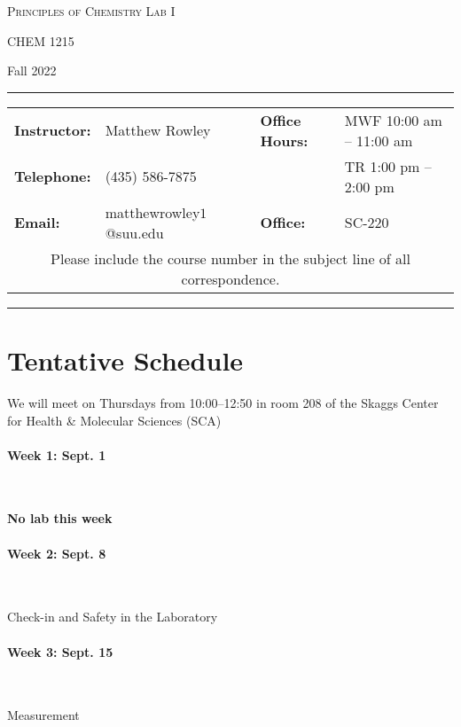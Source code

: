 \documentclass[12pt, letterpaper]{article}
\begin{document}
\begin{center}
	{\Large \textsc{Principles of Chemistry Lab I}}

	CHEM 1215
\end{center}
\begin{center}
	{\large Fall 2022}
\end{center}
\begin{center}
	\rule{0.99\textwidth}{0.4pt}
	\begin{tabular}{llcll}
		\textbf{Instructor:} & Matthew Rowley           &  & \textbf{Office Hours:} & MWF 10:00 am -- 11:00 am \\
		\textbf{Telephone:}  & (435) 586-7875           &  &                        & TR 1:00 pm -- 2:00 pm    \\
		\textbf{Email:}      & matthewrowley$1$@suu.edu &  & \textbf{Office:}       & SC-220                   \\
		\multicolumn{5}{c}{Please include the course number in the subject line of all correspondence.}
	\end{tabular}
	\rule{0.99\textwidth}{0.4pt}
\end{center}

\section*{Tentative Schedule}
\begin{description}
	\item We will meet on Thursdays from 10:00--12:50 in room 208 of the Skaggs Center for Health \& Molecular Sciences (SCA)
\end{description}

\paragraph*{Week 1: Sept. 1}~

\textbf{No lab this week}

\paragraph{Week 2: Sept. 8}~

Check-in and Safety in the Laboratory

\paragraph{Week 3: Sept. 15}~

Measurement
\end{document}
